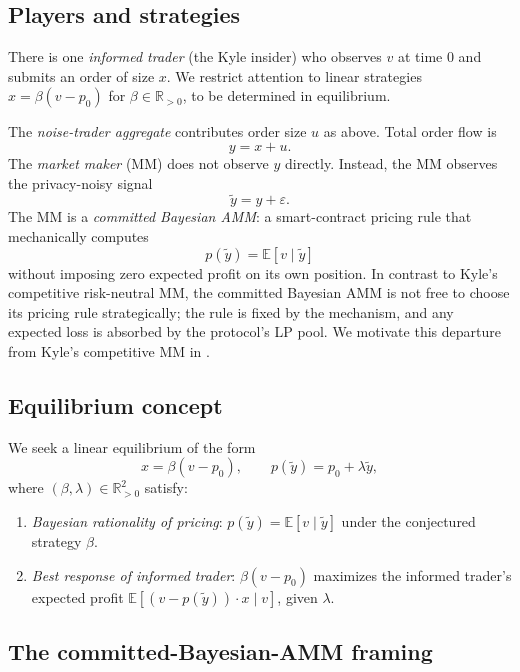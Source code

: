 \documentclass[runningheads]{llncs}
\newcommand{\R}{\mathbb{R}}
\newcommand{\E}{\mathbb{E}}
\newcommand{\ytil}{\tilde y}
\begin{document}
\subsection{Players and strategies}

There is one \emph{informed trader} (the Kyle insider) who observes
$v$ at time $0$ and submits an order of size $x$. We restrict
attention to linear strategies $x = \beta(v - p_0)$ for
$\beta \in \R_{>0}$, to be determined in equilibrium.

The \emph{noise-trader aggregate} contributes order size $u$ as
above. Total order flow is
\[
y = x + u.
\]
The \emph{market maker} (MM) does not observe $y$ directly. Instead,
the MM observes the privacy-noisy signal
\[
\ytil = y + \varepsilon.
\]
The MM is a \emph{committed Bayesian AMM}: a smart-contract pricing
rule that mechanically computes
\[
p(\ytil) = \E[v \mid \ytil]
\]
without imposing zero expected profit on its own position. In
contrast to Kyle's competitive risk-neutral MM, the committed
Bayesian AMM is not free to choose its pricing rule strategically;
the rule is fixed by the mechanism, and any expected loss is
absorbed by the protocol's LP pool. We motivate this departure
from Kyle's competitive MM in .

\subsection{Equilibrium concept}

We seek a linear equilibrium of the form
\[
x = \beta(v - p_0), \qquad p(\ytil) = p_0 + \lambda \ytil,
\]
where $(\beta, \lambda) \in \R_{>0}^2$ satisfy:
\begin{enumerate}[leftmargin=*]
\item \emph{Bayesian rationality of pricing}: $p(\ytil) =
\E[v \mid \ytil]$ under the conjectured strategy $\beta$.
\item \emph{Best response of informed trader}: $\beta(v - p_0)$
maximizes the informed trader's expected profit
$\E[(v - p(\ytil)) \cdot x \mid v]$, given $\lambda$.
\end{enumerate}

\subsection{The committed-Bayesian-AMM framing}
\label{ssec:framing}
\end{document}
